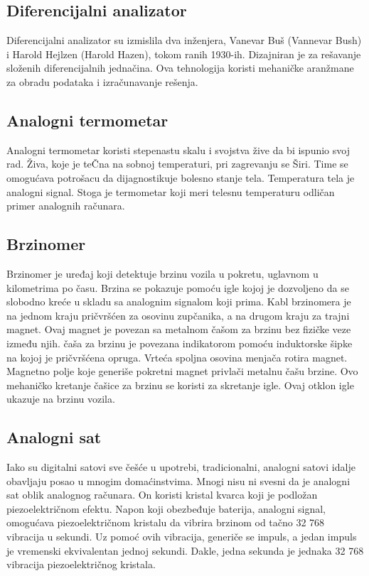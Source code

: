 \documentclass[a4paper]{article}
\begin{document}
{\subsection{Diferencijalni analizator}
\label{subsec:podnaslov3}

 Diferencijalni analizator su izmislila dva inženjera, Vanevar Buš (Vannevar Bush) i Harold Hejlzen (Harold Hazen), tokom ranih 1930-ih. Dizajniran je za rešavanje složenih diferencijalnih jednačina. Ova tehnologija koristi mehaničke aranžmane za obradu podataka i izračunavanje rešenja.

\subsection{Analogni termometar}
\label{subsec:podnaslov4}

Analogni termometar koristi stepenastu skalu i svojstva žive da bi ispunio svoj rad. Živa, koje je teČna na sobnoj temperaturi, pri zagrevanju se Širi. Time se omogućava potrošacu da dijagnostikuje bolesno stanje tela. Temperatura tela je analogni signal. Stoga je termometar koji meri telesnu temperaturu odličan primer analognih računara. 

\subsection{Brzinomer}
\label{subsec:podnaslov5}

Brzinomer je uređaj koji detektuje brzinu vozila u pokretu, uglavnom u kilometrima po času. Brzina se pokazuje pomoću igle kojoj je dozvoljeno da se slobodno kreće u skladu sa analognim signalom koji prima. Kabl brzinomera je na jednom kraju pričvršćen za osovinu zupčanika, a na drugom kraju za trajni magnet. Ovaj magnet je povezan sa metalnom čašom za brzinu bez fizičke veze između njih. čaša za brzinu je povezana indikatorom pomoću induktorske šipke na kojoj je pričvršćena opruga. Vrteća spoljna osovina menjača rotira magnet. Magnetno polje koje generiše pokretni magnet privlači metalnu čašu brzine. Ovo mehaničko kretanje čašice za brzinu se koristi za skretanje igle. Ovaj otklon igle ukazuje na brzinu vozila.


\subsection{Analogni sat}
\label{subsec:podnaslov6}


Iako su digitalni satovi sve češće u upotrebi, tradicionalni, analogni satovi idalje obavljaju posao u mnogim domaćinstvima. Mnogi nisu ni svesni da je analogni sat oblik analognog računara. On koristi kristal kvarca koji je podložan piezoelektričnom efektu. Napon koji obezbeđuje baterija, analogni signal, omogućava piezoelektričnom kristalu da vibrira brzinom od tačno 32 768 vibracija u sekundi. Uz pomoć ovih vibracija, generiče se impuls, a jedan impuls je vremenski ekvivalentan jednoj sekundi. Dakle, jedna sekunda je jednaka 32 768 vibracija piezoelektričnog kristala.


}
\end{document}
